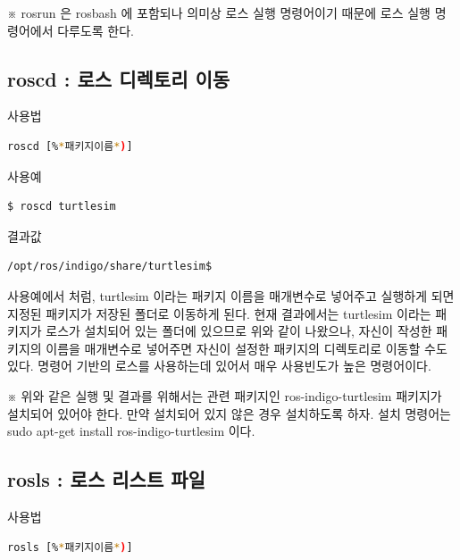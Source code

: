 \noindent
※ rosrun 은 rosbash 에 포함되나 의미상 로스 실행 명령어이기 때문에 로스 실행 명령어에서 다루도록 한다.

\subsection{roscd : 로스 디렉토리 이동}

\setcounter{num}{0}

\circled{\thenum} 사용법
\begin{lstlisting}[language=bash]
roscd [%*패키지이름*)]
\end{lstlisting}

\noindent
{}\circled{\thenum} 사용예
\begin{lstlisting}[language=bash]
$ roscd turtlesim
\end{lstlisting}

\noindent
{}\circled{\thenum} 결과값
\begin{lstlisting}[language=bash]
/opt/ros/indigo/share/turtlesim$
\end{lstlisting}

\vspace{\baselineskip}
\noindent
사용예에서 처럼, turtlesim 이라는 패키지 이름을 매개변수로 넣어주고 실행하게 되면 지정된 패키지가 저장된 폴더로 이동하게 된다. 현재 결과에서는 turtlesim 이라는 패키지가 로스가 설치되어 있는 폴더에 있으므로 위와 같이 나왔으나, 자신이 작성한 패키지의 이름을 매개변수로 넣어주면 자신이 설정한 패키지의 디렉토리로 이동할 수도 있다. 명령어 기반의 로스를 사용하는데 있어서 매우 사용빈도가 높은 명령어이다.

\vspace{\baselineskip}
\noindent
※ 위와 같은 실행 및 결과를 위해서는 관련 패키지인 ros-indigo-turtlesim 패키지가 설치되어 있어야 한다. 만약 설치되어 있지 않은 경우 설치하도록 하자. 설치 명령어는 sudo apt-get install ros-indigo-turtlesim  이다.

\subsection{rosls : 로스 리스트 파일}

\setcounter{num}{0}

\circled{\thenum} 사용법
\begin{lstlisting}[language=bash]
rosls [%*패키지이름*)]
\end{lstlisting}

